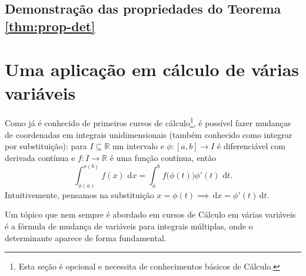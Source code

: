 \documentclass[../livro.tex]{subfiles}  %
\begin{document}
\subsection{Demonstração das propriedades do Teorema \ref*{thm:prop-det}}

\emconstrucao

\section{Uma aplicação em cálculo de várias variáveis}

Como já é conhecido de primeiros cursos de cálculo\footnote{Esta seção é opcional e necessita de conhecimentos básicos de Cálculo.}, é possível fazer mudanças de coordenadas em integrais unidimensionais (também conhecido como integrar por substituição): para $I \subseteq \mathbb{R}$ um intervalo e $\phi : [a,b] \to I$ é diferenciável com derivada contínua e $f: I \to \mathbb{R}$ é uma função contínua, então
\begin{equation}
\int_{\phi (a)}^{\phi (b)} f(x) \, \, \mathrm{d} x = \int_{a}^{b} f \big(\phi (t)\big) \phi'(t) \, \, \mathrm{d} t.
\end{equation} Intuitivemente, pensamos na substituição $x = \phi (t) \implies \, \mathrm{d} x = \phi' (t)\, \mathrm{d} t$.

Um tópico que nem sempre é abordado em cursos de Cálculo em várias variáveis é a fórmula de mudança de variáveis para integrais múltiplas, onde o determinante aparece de forma fundamental.
\end{document}
